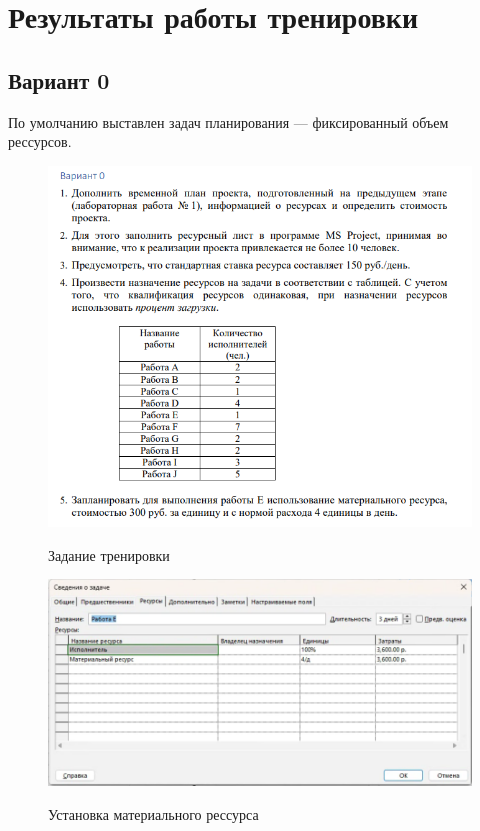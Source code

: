 \section{Результаты работы тренировки}

\subsection{Вариант 0}

По умолчанию выставлен задач планирования --- фиксированный объем рессурсов.

\begin{figure}[ht!]
	\includegraphics[width=0.75\linewidth]{assets/images/image_2024-02-27_09-41-29.png}
	\label{fig:r2}
	\caption{Задание тренировки}
\end{figure}
\FloatBarrier


\begin{figure}[ht!]
	\includegraphics[width=\linewidth]{assets/images/Screenshot 2024-02-27 at 14.25.08.png}
	\label{fig:r2}
	\caption{Установка материального рессурса}
\end{figure}
\FloatBarrier

